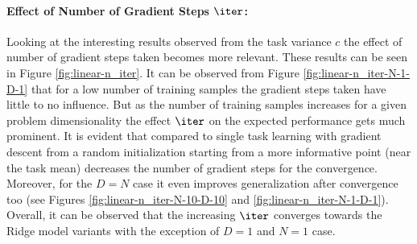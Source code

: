 \paragraph{Effect of Number of Gradient Steps $\iter$:} Looking at the interesting results observed from the task variance $c$  the effect of number of gradient steps taken becomes more relevant. These results can be seen in Figure \ref{fig:linear-n_iter}. It can be observed from Figure \ref{fig:linear-n_iter-N-1-D-1} that for a low number of training samples the gradient steps taken have little to no influence. But as the number of training samples increases for a given problem dimensionality the effect $\iter$ on the expected performance gets much prominent. It is evident that compared to single task learning with gradient descent from a random initialization starting from a more informative point (\eg near the task mean) decreases the number of gradient steps for the convergence. Moreover, for the $D=N$ case it even improves generalization after convergence too (see Figures \ref{fig:linear-n_iter-N-10-D-10} and \ref{fig:linear-n_iter-N-1-D-1}). Overall, it can be observed that the increasing $\iter$ converges towards the Ridge model variants with the exception of $D=1$ and $N=1$ case.
 
